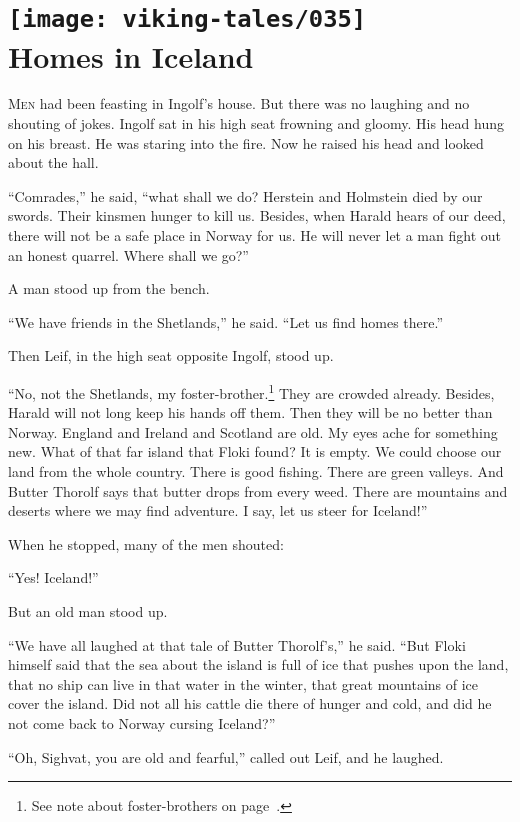 \chapter[Homes in Iceland]{
    \texttt{[image: viking-tales/035]}\\
    Homes in Iceland}

\lettrine{M}{en} had been feasting in Ingolf's house. But there was no
laughing and no shouting of jokes. Ingolf sat in his high seat frowning
and gloomy. His head hung on his breast. He was staring into the fire.
Now he raised his head and looked about the hall.

``Comrades,'' he said, ``what shall we do? Herstein and Holmstein died
by our swords. Their kinsmen hunger to kill us. Besides, when Harald
hears of our deed, there will not be a safe place in Norway for us. He
will never let a man fight out an honest quarrel. Where shall we go?''

A man stood up from the bench.

``We have friends in the Shetlands,'' he said. ``Let us find homes
there.''

Then Leif, in the high seat opposite Ingolf, stood up.

``No, not the Shetlands, my foster-brother.\footnote{See note about
foster-brothers on page~\pageref{foster-brothers}.} They are crowded
already. Besides, Harald will not long keep his hands off them. Then they
will be no better than Norway. England and Ireland and Scotland are old.
My eyes ache for something new. What of that far island that Floki found?
It is empty. We could choose our land from the whole country. There is
good fishing. There are green valleys. And Butter Thorolf says that
butter drops from every weed. There are mountains and deserts where we
may find adventure. I say, let us steer for Iceland!''

When he stopped, many of the men shouted:

``Yes! Iceland!''

But an old man stood up.

``We have all laughed at that tale of Butter Thorolf's,'' he said. ``But
Floki himself said that the sea about the island is full of ice that
pushes upon the land, that no ship can live in that water in the winter,
that great mountains of ice cover the island. Did not all his cattle die
there of hunger and cold, and did he not come back to Norway cursing
Iceland?''

``Oh, Sighvat, you are old and fearful,'' called out Leif, and he
laughed.

